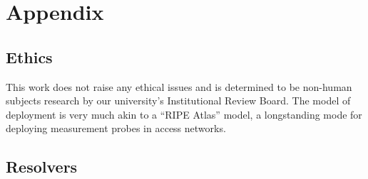 \appendix
\section{Appendix}

\subsection{Ethics}
This work does not raise any ethical issues and 
is determined to be non-human subjects research by our university's
Institutional Review Board.  The model of deployment is very much akin to a
``RIPE Atlas'' model, a longstanding mode for deploying measurement probes in
access networks.

\subsection{Resolvers}\label{sec:resolvers}
